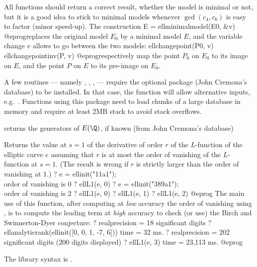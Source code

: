 All functions should return a correct result, whether the model is minimal or
not, but it is a good idea to stick to minimal models whenever
$\gcd(c_4,c_6)$ is easy to factor (minor speed-up). The construction
\bprog
  E = ellminimalmodel(E0, &v)
@eprog\noindent replaces the original model $E_0$ by a minimal model $E$,
and the variable change $v$ allows to go between the two models:
\bprog
  ellchangepoint(P0, v)
  ellchangepointinv(P, v)
@eprog\noindent respectively map the point $P_0$ on $E_0$ to its image on
$E$, and the point $P$ on $E$ to its pre-image on $E_0$.

A few routines --- namely , ,
,  --- require the optional package 
(John Cremona's database) to be installed. In that case, the function
 will allow alternative inputs, e.g.~.
Functions using this package need to load chunks of a large database in
memory and require at least 2MB stack to avoid stack overflows.

\item {} returns the generators of $E(\Q)$, if known (from John
  Cremona's database)


\label{se:ellL1}
Returns the value at $s=1$ of the derivative of order $r$ of the
$L$-function of the elliptic curve $e$ assuming that $r$ is at most the order
of vanishing of the $L$-function at $s=1$. (The result is wrong if $r$ is
strictly larger than the order of vanishing at 1.)
\bprog
? e = ellinit("11a1"); \\ order of vanishing is 0
? ellL1(e, 0)
? e = ellinit("389a1");  \\ order of vanishing is 2
? ellL1(e, 0)
? ellL1(e, 1)
? ellL1(e, 2)
@eprog\noindent
The main use of this function, after computing at \emph{low} accuracy the
order of vanishing using , is to compute the
leading term at \emph{high} accuracy to check (or use) the Birch and
Swinnerton-Dyer conjecture:
\bprog
? 
  realprecision = 18 significant digits
? ellanalyticrank(ellinit([0, 0, 1, -7, 6]))
time = 32 ms.
? 
  realprecision = 202 significant digits (200 digits displayed)
? ellL1(e, 3)
time = 23,113 ms.
@eprog

The library syntax is .

